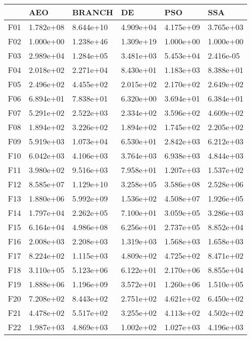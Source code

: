 \begin{tabular}{llllll}
\toprule
{} &        AEO &     BRANCH &         DE &        PSO &        SSA \\
\midrule
F01  &  1.782e+08 &  8.644e+10 &  4.909e+04 &  4.175e+09 &  3.765e+03 \\
F02  &  1.000e+00 &  1.238e+46 &  1.309e+19 &  1.000e+00 &  1.000e+00 \\
F03  &  2.989e+04 &  1.284e+05 &  3.481e+03 &  5.453e+04 &  2.416e-05 \\
F04  &  2.018e+02 &  2.271e+04 &  8.430e+01 &  1.183e+03 &  8.388e+01 \\
F05  &  2.496e+02 &  4.455e+02 &  2.015e+02 &  2.170e+02 &  2.649e+02 \\
F06  &  6.894e+01 &  7.838e+01 &  6.320e+00 &  3.694e+01 &  6.384e+01 \\
F07  &  5.291e+02 &  2.522e+03 &  2.334e+02 &  3.596e+02 &  4.609e+02 \\
F08  &  1.894e+02 &  3.226e+02 &  1.894e+02 &  1.745e+02 &  2.205e+02 \\
F09  &  5.919e+03 &  1.073e+04 &  6.530e+01 &  2.842e+03 &  6.212e+03 \\
F10  &  6.042e+03 &  4.106e+03 &  3.764e+03 &  6.938e+03 &  4.844e+03 \\
F11  &  3.980e+02 &  9.516e+03 &  7.958e+01 &  1.207e+03 &  1.537e+02 \\
F12  &  8.585e+07 &  1.129e+10 &  3.258e+05 &  3.586e+08 &  2.528e+06 \\
F13  &  1.880e+06 &  5.992e+09 &  1.536e+02 &  4.508e+07 &  1.926e+05 \\
F14  &  1.797e+04 &  2.262e+05 &  7.100e+01 &  3.059e+05 &  3.286e+03 \\
F15  &  6.164e+04 &  4.986e+08 &  6.256e+01 &  2.737e+05 &  8.852e+04 \\
F16  &  2.008e+03 &  2.208e+03 &  1.319e+03 &  1.568e+03 &  1.658e+03 \\
F17  &  8.224e+02 &  1.115e+03 &  4.809e+02 &  4.725e+02 &  8.471e+02 \\
F18  &  3.110e+05 &  5.123e+06 &  6.122e+01 &  2.170e+06 &  8.855e+04 \\
F19  &  1.888e+06 &  1.196e+09 &  3.572e+01 &  1.260e+06 &  1.510e+05 \\
F20  &  7.208e+02 &  8.443e+02 &  2.751e+02 &  4.621e+02 &  6.450e+02 \\
F21  &  4.478e+02 &  5.517e+02 &  3.255e+02 &  4.113e+02 &  4.502e+02 \\
F22  &  1.987e+03 &  4.869e+03 &  1.002e+02 &  1.027e+03 &  4.196e+03 \\

\end{tabular}
